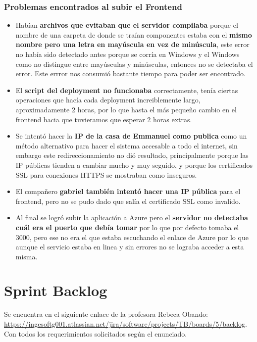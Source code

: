 \documentclass{article}
\begin{document}
 \subsubsection{Problemas encontrados al subir el Frontend}
 \begin{itemize}
  \item Habían \textbf{archivos que evitaban que el servidor compilaba} porque el nombre de una
  carpeta de donde se traían componentes estaba con el \textbf{mismo nombre pero una letra en mayúscula en vez de minúscula},
  este error no había sido detectado antes porque se corría en Windows y el Windows como no distingue
  entre mayúsculas y minúsculas, entonces no se detectaba el error. Este errror nos consumió 
  bastante tiempo para poder ser encontrado.

  \item El \textbf{script del deployment no funcionaba} correctamente, tenía ciertas operaciones
  que hacía cada deployment increiblemente largo, aproximadamente 2 horas, por lo que hasta el más
  pequeño cambio en el frontend hacia que tuvieramos que esperar 2 horas extras.

  \item Se intentó hacer la \textbf{IP de la casa de Emmanuel como publica} como un método
  alternativo para hacer el sistema accesable a todo el internet, sin embargo este redireccionamiento
  no dió resultado, principalmente porque las IP públicas tienden a cambiar mucho y muy seguido, y
  porque los certificados SSL para conexiones HTTPS se mostraban como inseguros.

  \item El compañero \textbf{gabriel también intentó hacer una IP pública} para el frontend, pero no 
  se pudo dado que salía el certificado SSL como invalido.

  \item Al final se logró subir la aplicación a Azure pero el \textbf{servidor no detectaba cuál era el puerto que debía tomar}
  por lo que por defecto tomaba el 3000, pero ese no era el que estaba escuchando el enlace de
  Azure por lo que aunque el servicio estaba en linea y sin errores no se lograba acceder a esta misma.
 \end{itemize}

\section{Sprint Backlog}
Se encuentra en el siguiente enlace de la profesora Rebeca Obando: \url{https://ingesoftg001.atlassian.net/jira/software/projects/TB/boards/5/backlog}.
Con todos los requerimientos solicitados según el enunciado.
\end{document}
